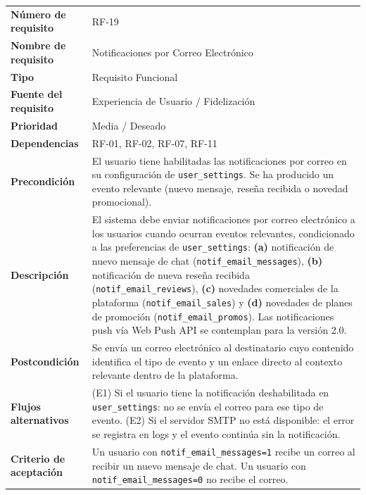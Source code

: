 \documentclass[11pt,a4paper]{report}
\begin{document}
\begin{table}[H]
\centering
\begin{tabularx}{\textwidth}{|l|L|}
\hline
{} \\ \hline
\textbf{Número de requisito} & RF-19 \\ \hline
\textbf{Nombre de requisito} & Notificaciones por Correo Electrónico \\ \hline
\textbf{Tipo} & Requisito Funcional \\ \hline
\textbf{Fuente del requisito} & Experiencia de Usuario / Fidelización \\ \hline
\textbf{Prioridad} & Media / Deseado \\ \hline
\textbf{Dependencias} & RF-01, RF-02, RF-07, RF-11 \\ \hline
\textbf{Precondición} & El usuario tiene habilitadas las notificaciones por correo en su configuración de \texttt{user\_settings}. Se ha producido un evento relevante (nuevo mensaje, reseña recibida o novedad promocional). \\ \hline
\textbf{Descripción} & El sistema debe enviar notificaciones por correo electrónico a los usuarios cuando ocurran eventos relevantes, condicionado a las preferencias de \texttt{user\_settings}: \textbf{(a)} notificación de nuevo mensaje de chat (\texttt{notif\_email\_messages}), \textbf{(b)} notificación de nueva reseña recibida (\texttt{notif\_email\_reviews}), \textbf{(c)} novedades comerciales de la plataforma (\texttt{notif\_email\_sales}) y \textbf{(d)} novedades de planes de promoción (\texttt{notif\_email\_promos}). Las notificaciones push vía Web Push API se contemplan para la versión 2.0. \\ \hline
\textbf{Postcondición} & Se envía un correo electrónico al destinatario cuyo contenido identifica el tipo de evento y un enlace directo al contexto relevante dentro de la plataforma. \\ \hline
\textbf{Flujos alternativos} & (E1) Si el usuario tiene la notificación deshabilitada en \texttt{user\_settings}: no se envía el correo para ese tipo de evento. (E2) Si el servidor SMTP no está disponible: el error se registra en logs y el evento continúa sin la notificación. \\ \hline
\textbf{Criterio de aceptación} & Un usuario con \texttt{notif\_email\_messages=1} recibe un correo al recibir un nuevo mensaje de chat. Un usuario con \texttt{notif\_email\_messages=0} no recibe el correo. \\ \hline
\end{tabularx}
\end{table}
\end{document}
